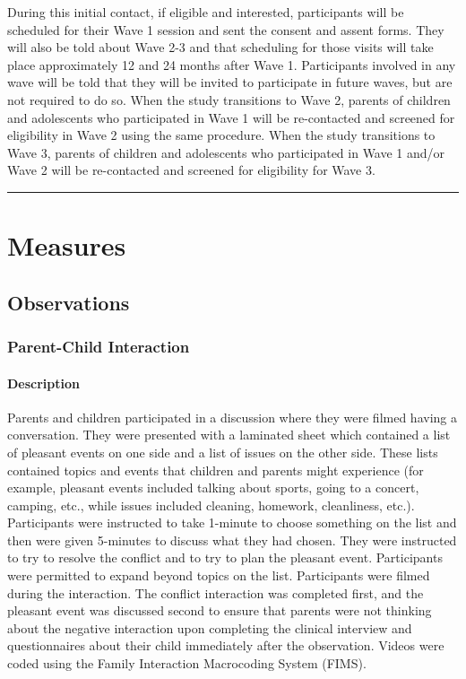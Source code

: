 \documentclass[]{book}
\let\oldparagraph\paragraph
\renewcommand{\paragraph}[1]{\oldparagraph{#1}\mbox{}}
\begin{document}
During this initial contact, if eligible and interested, participants will be scheduled for their Wave 1 session and sent the consent and assent forms. They will also be told about Wave 2-3 and that scheduling for those visits will take place approximately 12 and 24 months after Wave 1. Participants involved in any wave will be told that they will be invited to participate in future waves, but are not required to do so. When the study transitions to Wave 2, parents of children and adolescents who participated in Wave 1 will be re-contacted and screened for eligibility in Wave 2 using the same procedure. When the study transitions to Wave 3, parents of children and adolescents who participated in Wave 1 and/or Wave 2 will be re-contacted and screened for eligibility for Wave 3.

\begin{center}\rule{0.5\linewidth}{0.5pt}\end{center}

\hypertarget{measures}{%
\section{Measures}\label{measures}}

\hypertarget{observations}{%
\subsection{Observations}\label{observations}}

\hypertarget{parent-child-interaction}{%
\subsubsection{Parent-Child Interaction}\label{parent-child-interaction}}

\hypertarget{description}{%
\paragraph{Description}\label{description}}

Parents and children participated in a discussion where they were filmed having a conversation. They were presented with a laminated sheet which contained a list of pleasant events on one side and a list of issues on the other side. These lists contained topics and events that children and parents might experience (for example, pleasant events included talking about sports, going to a concert, camping, etc., while issues included cleaning, homework, cleanliness, etc.). Participants were instructed to take 1-minute to choose something on the list and then were given 5-minutes to discuss what they had chosen. They were instructed to try to resolve the conflict and to try to plan the pleasant event. Participants were permitted to expand beyond topics on the list. Participants were filmed during the interaction. The conflict interaction was completed first, and the pleasant event was discussed second to ensure that parents were not thinking about the negative interaction upon completing the clinical interview and questionnaires about their child immediately after the observation. Videos were coded using the Family Interaction Macrocoding System (FIMS)\citep{holmbeck_1995}.
\end{document}
